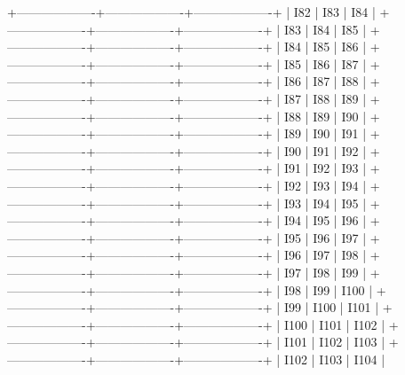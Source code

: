 +-------------------+-------------------+-------------------+
|       I82          |       I83          |       I84         |
+-------------------+-------------------+-------------------+
|       I83          |       I84          |       I85         |
+-------------------+-------------------+-------------------+
|       I84          |       I85          |       I86         |
+-------------------+-------------------+-------------------+
|       I85          |       I86          |       I87         |
+-------------------+-------------------+-------------------+
|       I86          |       I87          |       I88         |
+-------------------+-------------------+-------------------+
|       I87          |       I88          |       I89         |
+-------------------+-------------------+-------------------+
|       I88          |       I89          |       I90         |
+-------------------+-------------------+-------------------+
|       I89          |       I90          |       I91         |
+-------------------+-------------------+-------------------+
|       I90          |       I91          |       I92         |
+-------------------+-------------------+-------------------+
|       I91          |       I92          |       I93         |
+-------------------+-------------------+-------------------+
|       I92          |       I93          |       I94         |
+-------------------+-------------------+-------------------+
|       I93          |       I94          |       I95         |
+-------------------+-------------------+-------------------+
|       I94          |       I95          |       I96         |
+-------------------+-------------------+-------------------+
|       I95          |       I96          |       I97         |
+-------------------+-------------------+-------------------+
|       I96          |       I97          |       I98         |
+-------------------+-------------------+-------------------+
|       I97          |       I98          |       I99         |
+-------------------+-------------------+-------------------+
|       I98          |       I99          |       I100        |
+-------------------+-------------------+-------------------+
|       I99          |       I100         |       I101        |
+-------------------+-------------------+-------------------+
|       I100         |       I101         |       I102        |
+-------------------+-------------------+-------------------+
|       I101         |       I102         |       I103        |
+-------------------+-------------------+-------------------+
|       I102         |       I103         |       I104        |
